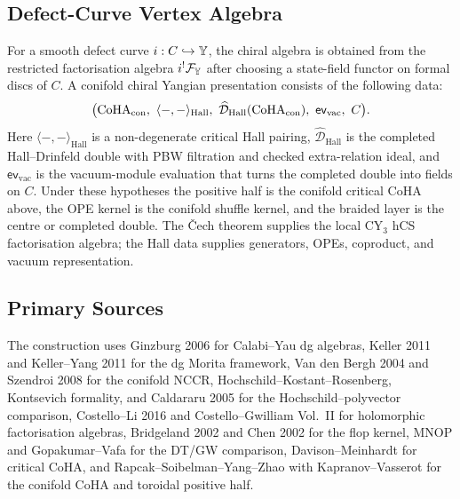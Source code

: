 \subsection*{Defect-Curve Vertex Algebra}

For a smooth defect curve $i:C\hookrightarrow\mathbb{Y}$, the chiral algebra
is obtained from the restricted factorisation algebra $i^!\mathcal{F}_{\mathbb{Y}}$
after choosing a state-field functor on formal discs of $C$. A
conifold chiral Yangian presentation consists of the following data:
\[
  \bigl(\CoHA_{\mathrm{con}},\ \langle-,-\rangle_{\mathrm{Hall}},\
  \widehat{\mathcal D}_{\mathrm{Hall}}(\CoHA_{\mathrm{con}}),\
  \mathsf{ev}_{\mathrm{vac}},\ C\bigr).
\]
Here $\langle-,-\rangle_{\mathrm{Hall}}$ is a non-degenerate critical
Hall pairing, $\widehat{\mathcal D}_{\mathrm{Hall}}$ is the completed
Hall--Drinfeld double with PBW filtration and checked extra-relation
ideal, and $\mathsf{ev}_{\mathrm{vac}}$ is the vacuum-module evaluation
that turns the completed double into fields on $C$. Under these
hypotheses the positive half is the conifold critical CoHA above, the
OPE kernel is the conifold shuffle kernel, and the braided layer is the
centre or completed double. The \v{C}ech theorem supplies the local
CY$_3$ hCS factorisation algebra; the Hall data supplies generators,
OPEs, coproduct, and vacuum representation.

\subsection*{Primary Sources}

The construction uses Ginzburg 2006 for Calabi--Yau dg algebras,
Keller 2011 and Keller--Yang 2011 for the dg Morita framework,
Van den Bergh 2004 and Szendroi 2008 for the conifold NCCR,
Hochschild--Kostant--Rosenberg, Kontsevich formality, and Caldararu
2005 for the Hochschild--polyvector comparison, Costello--Li 2016 and
Costello--Gwilliam Vol.~II for holomorphic factorisation algebras,
Bridgeland 2002 and Chen 2002 for the flop kernel, MNOP and
Gopakumar--Vafa for the DT/GW comparison, Davison--Meinhardt for
critical CoHA, and Rapcak--Soibelman--Yang--Zhao with
Kapranov--Vasserot for the conifold CoHA and toroidal positive half.
